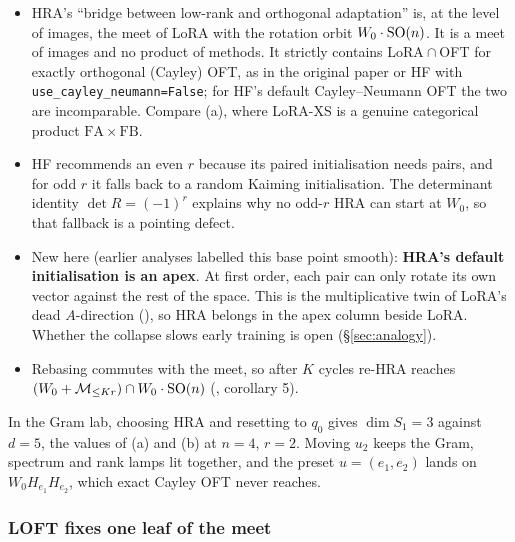 \begin{explains}
\begin{itemize}[leftmargin=1.2em]
  \item HRA's ``bridge between low-rank and orthogonal adaptation'' is, at the level of images, the meet of LoRA with the
    rotation orbit $W_0\cdot\mathrm{SO}(n)$. It is a meet of images and no product of methods. It strictly contains
    LoRA${}\cap{}$OFT for exactly orthogonal (Cayley) OFT, as in the original paper or HF with
    \texttt{use\_cayley\_\allowbreak neumann=False}; for HF's default Cayley--Neumann OFT the two are incomparable. Compare
    (a), where LoRA-XS \citep{baazy2024lora} is a genuine categorical product
    $\mathrm{FA}\times\mathrm{FB}$.
  \item HF recommends an even $r$ because its paired initialisation needs pairs, and for odd $r$ it falls back to a
    random Kaiming initialisation. The determinant identity $\det R=(-1)^r$ explains why no odd-$r$ HRA can start at
    $W_0$, so that fallback is a pointing defect.
  \item New here (earlier analyses labelled this base point smooth): \textbf{HRA's default initialisation is an apex}. At
    first order, each pair can only rotate its own vector against the rest of the space. This is the multiplicative twin
    of LoRA's dead $A$-direction (), so HRA belongs in the apex column beside LoRA. Whether the
    collapse slows early training is open (\S\ref{sec:analogy}).
  \item Rebasing commutes with the meet, so after $K$ cycles re-HRA reaches $(W_0+\mathcal M_{\le Kr})\cap W_0\cdot\mathrm{SO}(n)$
    (, corollary 5).
\end{itemize}
\end{explains}

In the Gram lab, choosing HRA and resetting to $q_0$ gives $\dim S_1=3$ against $d=5$, the values of (a) and (b) at
$n=4$, $r=2$. Moving $u_2$ keeps the Gram, spectrum and rank lamps lit together, and the preset $u=(e_1,e_2)$ lands on
$W_0H_{e_1}H_{e_2}$, which exact Cayley OFT never reaches.

\subsubsection{LOFT fixes one leaf of the meet}\label{sec:erlangen-loft}

